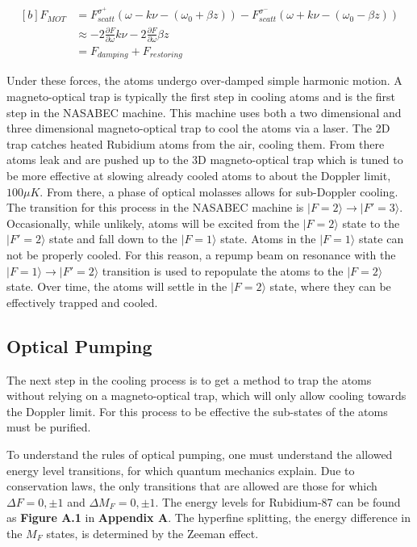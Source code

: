 \begin{equation}
        \begin{aligned}[b]
    F_{MOT} &= F_{scatt}^{\sigma^+}(\omega - k\nu - (\omega_0 + \beta z)) - F_{scatt}^{\sigma^-}(\omega + k\nu - (\omega_0 -\beta z)) \\
    & \approx -2 \frac{\partial F}{\partial \omega} k \nu -2 \frac{\partial F}{\partial \omega} \beta z \\
    &= F_{damping} + F_{restoring}
        \end{aligned}
\label{eqn2.qo}
\end{equation}

Under these forces, the atoms undergo over-damped simple harmonic motion. A magneto-optical trap is typically the first step in cooling atoms and is the first step in the NASABEC machine. This machine uses both a two dimensional and three dimensional magneto-optical trap to cool the atoms via a laser. The 2D trap catches heated Rubidium atoms from the air, cooling them. From there atoms leak and are pushed up to the 3D magneto-optical trap which is tuned to be more effective at slowing already cooled atoms to about the Doppler limit, $100 \mu K $. From there, a phase of optical molasses allows for sub-Doppler cooling. The transition for this process in the NASABEC machine is $| F=2\rangle \rightarrow |F'=3\rangle$. Occasionally, while unlikely, atoms will be excited from the $| F=2\rangle$ state to the $| F'=2\rangle$ state and fall down to the $| F=1\rangle$ state. Atoms in the $| F=1\rangle$ state can not be properly cooled. For this reason, a repump beam on resonance with the $| F=1\rangle \rightarrow |F'=2\rangle$ transition is used to repopulate the atoms to the $|F=2\rangle$ state. Over time, the atoms will settle in the $|F=2\rangle$ state, where they can be effectively trapped and cooled. 
\newline

\subsection{Optical Pumping}

The next step in the cooling process is to get a method to trap the atoms without relying on a magneto-optical trap, which will only allow cooling towards the Doppler limit. For this process to be effective the sub-states of the atoms must be purified.

To understand the rules of optical pumping, one must understand the allowed energy level transitions, for which quantum mechanics explain\cite{introQM}. Due to conservation laws, the only transitions that are allowed are those for which $\Delta F = 0, \pm 1$ and $\Delta M_F = 0, \pm 1$. The energy levels for Rubidium-87 can be found as \textbf{Figure A.1} in \textbf{Appendix A}. The hyperfine splitting, the energy difference in the $M_F$ states, is determined by the Zeeman effect.

